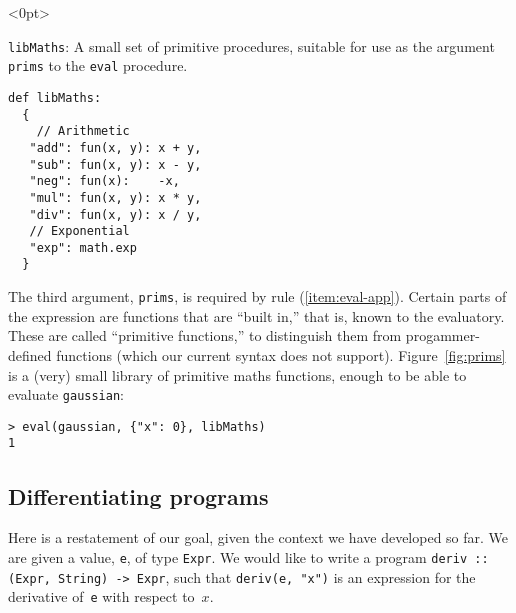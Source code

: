 \documentclass[11pt, a4paper]{article}
\newcommand{\cd}[1]{\texttt{#1}}
\begin{document}
\begin{marginfigure}<0pt>
  \caption{\cd{libMaths}: A small set of primitive procedures, suitable for use as
    the argument \cd{prims} to the \cd{eval} procedure.\label{fig:prims}}
\footnotesize
\begin{verbatim}
def libMaths:
  {
    // Arithmetic 
   "add": fun(x, y): x + y, 
   "sub": fun(x, y): x - y,
   "neg": fun(x):    -x,
   "mul": fun(x, y): x * y,
   "div": fun(x, y): x / y,
   // Exponential
   "exp": math.exp
  }
\end{verbatim}
\end{marginfigure}
The third argument, \cd{prims}, is required by rule
(\ref{item:eval-app}). Certain parts of the expression are functions
that are ``built in,'' that is, known to the evaluatory. These are
called ``primitive functions,'' to distinguish them from
progammer-defined functions (which our current syntax does not
support). Figure~\ref{fig:prims} is a (very) small library of
primitive maths functions, enough to be able to evaluate
\cd{gaussian}:
\begin{verbatim}
> eval(gaussian, {"x": 0}, libMaths)
1
\end{verbatim}

\subsection{Differentiating programs}

Here is a restatement of our goal, given the context we have developed
so far. We are given a value, \cd{e}, of type \cd{Expr}. We would like
to write a program \cd{deriv :: (Expr, String) -> Expr}, such that
\cd{deriv(e, "x")} is an expression for the derivative of~\cd{e} with
respect to~$x$.

\end{document}
